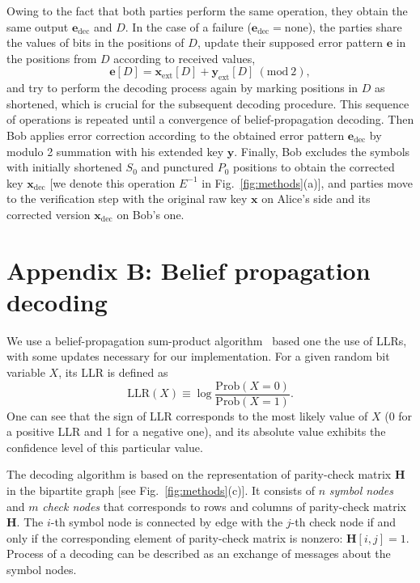 \documentclass[aps,pra,twocolumn,amsmath,amssymb,nofootinbib,showpacs,superscriptaddress]{revtex4-1}
\newcommand{\xb}{\mathbf{x}}
\newcommand{\xeb}{\mathbf{x}_{\mathrm{ext}}}
\newcommand{\xd}{\mathbf{x}_{\mathrm{dec}}}
\newcommand{\yb}{\mathbf{y}}
\newcommand{\yeb}{\mathbf{y}_{\mathrm{ext}}}
\newcommand{\eb}{\mathbf{e}}
\newcommand{\Hb}{\mathbf{H}}
\newcommand{\ed}{\eb_\mathrm{dec} }
\newcommand{\LLR}{\mathrm{LLR}}
\begin{document}
Owing to the fact that both parties perform the same operation, they obtain the same output $\eb_\mathrm{dec}$ and $D$.
In the case of a failure ($\eb_\mathrm{dec}=\mathrm{none}$), 
the parties share the values of bits in the positions of $D$, update their supposed error pattern $\eb$ in the positions from $D$ according to received values,
\begin{equation}
	\eb[D] = \xeb[D]+\yeb[D]~(\mathrm{mod}~2),
\end{equation}
and try to perform the decoding process again by marking positions in $D$ as shortened, which is crucial for the subsequent decoding procedure.
This sequence of operations is repeated until a convergence of belief-propagation decoding.
Then Bob applies error correction according to the obtained error pattern $\ed$ by modulo 2 summation with his extended key $\yb$.
Finally, Bob excludes the symbols with initially shortened $S_0$ and punctured $P_0$ positions to obtain the corrected key $\xd$ [we denote this operation $E^{-1}$ in Fig.~\ref{fig:methods}(a)], 
and parties move to the verification step with the original raw key $\xb$ on Alice's side and its corrected version $\xd$ on Bob's one.

\setcounter{equation}{0}
\renewcommand{\theequation}{B\arabic{equation}}
\newcommand{\ab}{{\bf a}}


\section*{Appendix B: Belief propagation decoding}

We use a belief-propagation sum-product algorithm~\cite{LDPC_orig2} based one the use of LLRs, with some updates necessary for our implementation.
For a given random bit variable $X$, its LLR is defined as
\begin{equation}
	\LLR(X) \equiv \log\frac{\mathrm{Prob}(X=0)}{\mathrm{Prob}(X=1)}.
\end{equation}
One can see that the sign of LLR corresponds to the most likely value of $X$ (0 for a positive LLR and 1 for a negative one), and its absolute value exhibits the confidence level of this particular value.

The decoding algorithm is based on the representation of parity-check matrix $\Hb$ in the bipartite graph [see Fig.~\ref{fig:methods}(c)].
It consists of $n$ \emph{symbol nodes} and $m$ \emph{check nodes} that corresponds to rows and columns of parity-check matrix $\Hb$.
The $i$-th symbol node is connected by edge with the $j$-th check node if and only if the corresponding element of parity-check matrix is nonzero: $\Hb[i,j]=1$.
Process of a decoding can be described as an exchange of messages about the symbol nodes. 
\end{document}
